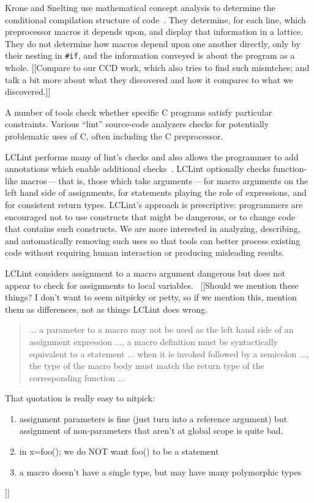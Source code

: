 \documentclass[10pt]{article}
\begin{document}
Krone and Snelting use mathematical concept analysis to determine the
conditional compilation structure of code~\cite{Krone94}.  They determine,
for each line, which preprocessor macros it depends upon, and display that
information in a lattice.  They do not determine how macros depend upon one
another directly, only by their nesting in {\tt \#if}, and the information
conveyed is about the program as a whole.  [[Compare to our CCD work, which
also tries to find such mismtches; and talk a bit more about what they
discovered and how it compares to what we discovered.]]


A number of tools check whether specific C programs satisfy particular
constraints.  Various ``lint'' source-code analyzers checks for
potentially problematic uses of C, often including the C preprocessor.


LCLint performs many of lint's checks and also
allows the programmer to add annotations which enable additional
checks~\cite{Evans-fse94}.
LCLint optionally checks function-like
macros\,---\,that is, those which take arguments\,---\,for
macro arguments on the left hand side of assignments, for statements
playing the role of expressions, and for consistent return types.
LCLint's approach is prescriptive: programmers are encouraged not to use
constructs that might be dangerous, or to change code that contains such
constructs.  We are more interested in analyzing, describing, and
automatically removing such uses so that tools can better process existing
code without requiring human interaction or producing misleading results.

LCLint
considers assignment to a macro argument dangerous but does not appear
to check for assignments to local variables.~\cite[\S 8]{Evans:LCLint}
[[Should we mention these things?  I don't want to seem nitpicky or petty, so
if we mention this, mention them as differences, not as things LCLint does
wrong.
\begin{quote}
$\ldots$ a parameter to a macro may not be used as the left hand side
of an assignment expression $\ldots$, a macro definition must be
syntactically equivalent to a statement $\ldots$ when it is invoked followed by
a semicolon $\ldots$, the type of the macro body must match the return
type of the corresponding function $\ldots$~\cite[\S 8]{Evans:LCLint}
\end{quote}
That quotation is really easy to nitpick:
\begin{enumerate}
 \item assignment parameters is fine (just turn into a reference argument) but
    assignment of non-parameters that aren't at global scope is quite bad.
 \item in x=foo(); we do NOT want foo() to be a statement
 \item a macro doesn't have a single type, but may have many polymorphic types
\end{enumerate}
]]
\end{document}
